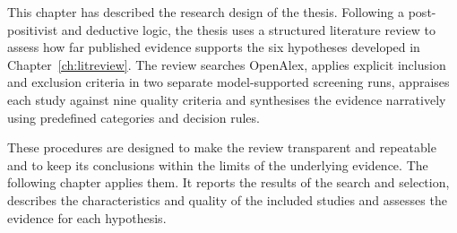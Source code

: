 This chapter has described the research design of the thesis. Following a post-positivist and deductive logic, the thesis uses a structured literature review to assess how far published evidence supports the six hypotheses developed in Chapter~\ref{ch:litreview}. The review searches OpenAlex, applies explicit inclusion and exclusion criteria in two separate model-supported screening runs, appraises each study against nine quality criteria and synthesises the evidence narratively using predefined categories and decision rules.

These procedures are designed to make the review transparent and repeatable and to keep its conclusions within the limits of the underlying evidence. The following chapter applies them. It reports the results of the search and selection, describes the characteristics and quality of the included studies and assesses the evidence for each hypothesis.
